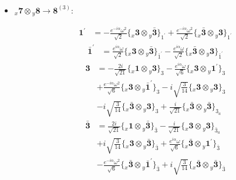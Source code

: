 \documentclass[english]{article}
\newcommand{\rep}[1]{\mathbf{#1}}
\newcommand{\repx}[2]{{}_{#2}\mathbf{#1}}
\newcommand{\tsprodx}[2]{\repx{#1}{x}\otimes\repx{#2}{y}}
\newcommand{\subcgt}[3]{\big\{ \tsprodx{#1}{#2}\big\}^{}_{#3}}
\begin{document}
\begin{itemize}
\begin{fleqn}
\begin{align*}
\end{align*}
\end{fleqn}
\item $\tsprodx{7}{8}\to\rep{8}^{(3)}$:
\begin{fleqn}
\begin{align*}
\rep{1^{\prime}} & = -\frac{e^{-i \alpha } \omega ^2}{\sqrt{2}}\subcgt{3}{\bar{3}}{1^{\prime}}+\frac{e^{-i \alpha } \omega ^2}{\sqrt{2}}\subcgt{\bar{3}}{3}{1^{\prime}}
\end{align*}
\begin{align*}
\rep{\bar{1}^{\prime}} & = \frac{e^{i \alpha } \omega }{\sqrt{2}}\subcgt{3}{\bar{3}}{\bar{1}^{\prime}}-\frac{e^{i \alpha } \omega }{\sqrt{2}}\subcgt{\bar{3}}{3}{\bar{1}^{\prime}}
\end{align*}
\begin{align*}
\rep{3} & = -\frac{2 i}{\sqrt{21}}\subcgt{1}{3}{3}-\frac{e^{i \alpha } \omega }{\sqrt{6}}\subcgt{3}{1^{\prime}}{3} \\ 
 & +\frac{e^{-i \alpha } \omega ^2}{\sqrt{6}}\subcgt{3}{\bar{1}^{\prime}}{3}-i \sqrt{\frac{3}{14}}\subcgt{3}{3}{3} \\ 
 & -i \sqrt{\frac{3}{14}}\subcgt{\bar{3}}{3}{3}+\frac{i}{\sqrt{21}}\subcgt{\bar{3}}{\bar{3}}{3_{a}}
\end{align*}
\begin{align*}
\rep{\bar{3}} & = \frac{2 i}{\sqrt{21}}\subcgt{1}{\bar{3}}{\bar{3}}-\frac{i}{\sqrt{21}}\subcgt{3}{3}{\bar{3}_{a}} \\ 
 & +i \sqrt{\frac{3}{14}}\subcgt{3}{\bar{3}}{\bar{3}}+\frac{e^{i \alpha } \omega }{\sqrt{6}}\subcgt{\bar{3}}{1^{\prime}}{\bar{3}} \\ 
 & -\frac{e^{-i \alpha } \omega ^2}{\sqrt{6}}\subcgt{\bar{3}}{\bar{1}^{\prime}}{\bar{3}}+i \sqrt{\frac{3}{14}}\subcgt{\bar{3}}{\bar{3}}{\bar{3}}
\end{align*}
\end{fleqn}
\end{itemize}
\end{document}
